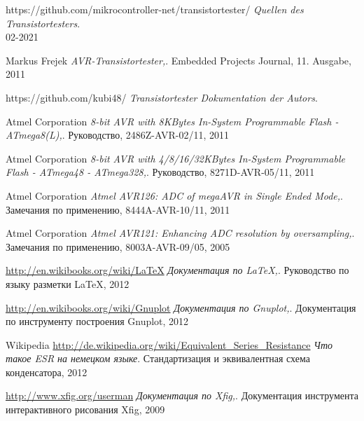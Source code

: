 \documentclass[12pt,a4paper,oneside,english]{report}
\DeclareRobustCommand{\_}{\ifmmode{\rule{1ex}{.4pt}}\else \textunderscore\hspace{0pt}\fi}
\begin{document}








 
 
 
 
 
 






\begin{thebibliography}{99}

https://github.com/mikrocontroller-net/transistortester/
\emph{Quellen des Transistortesters}. 
\\ 02-2021

Markus Frejek
\emph{AVR-Transistortester,}.
Embedded Projects Journal,
11. Ausgabe,
2011

https://github.com/kubi48/
\emph{Transistortester Dokumentation der Autors}.

Atmel Corporation
\emph{8-bit AVR with 8KBytes In-System Programmable Flash - ATmega8(L),}.
Руководство,
2486Z-AVR-02/11,
2011

Atmel Corporation
\emph{8-bit AVR with 4/8/16/32KBytes In-System Programmable Flash - ATmega48 - ATmega328,}.
Руководство,
8271D-AVR-05/11,
2011

Atmel Corporation
\emph{Atmel AVR126: ADC of megaAVR in Single Ended Mode,}.
Замечания по применению,
8444A-AVR-10/11,
2011

Atmel Corporation
\emph{Atmel AVR121: Enhancing ADC resolution by oversampling,}.
Замечания по применению,
8003A-AVR-09/05,
2005

\url{http://en.wikibooks.org/wiki/LaTeX}
\emph{Документация по LaTeX,}.
Руководство по языку разметки LaTeX,
2012

\url{http://en.wikibooks.org/wiki/Gnuplot}
\emph{Документация по Gnuplot,}.
Документация по инструменту построения Gnuplot,
2012

Wikipedia
\url{http://de.wikipedia.org/wiki/Equivalent_Series_Resistance}
\emph{Что такое ESR на немецком языке}.
Стандартизация и эквивалентная схема конденсатора,
2012


\url{http://www.xfig.org/userman}
\emph{Документация по Xfig,}.
Документация инструмента интерактивного рисования Xfig,
2009


\end{thebibliography}
\end{document}
